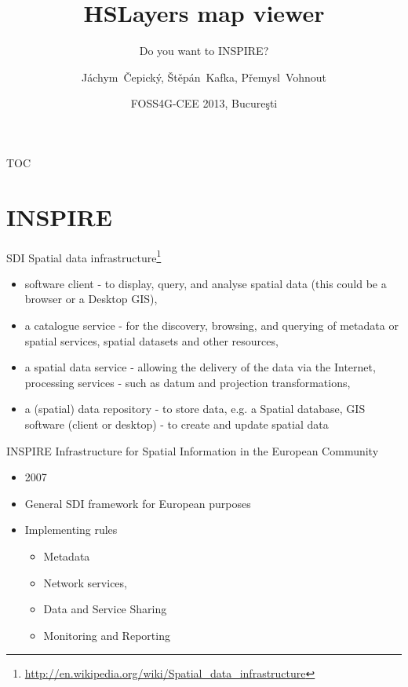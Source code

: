 \documentclass[xcolor=dvipsnames]{beamer}
\title[HSLayers] %
{HSLayers map viewer}
\subtitle {Do you want to INSPIRE?}
\author[J. Čepický] %
{Jáchym~Čepický\inst{1}, Štěpán~Kafka\inst{1}, Přemysl~Vohnout\inst{2}}
\institute %
{
  \inst{1}%
  Help Service - Remote Sensing s.r.o. \\
  Benešov\\
  \url{http://hsrs.cz}\\

  \inst{2}%
  Czech Center for Science and Society\\
  Prague\\
  \url{http://ccss.cz}\\
}
\date[] %
{FOSS4G-CEE 2013, Bucure\c{s}ti}
\begin{document}
\begin{frame}
  \titlepage
\end{frame}

\begin{frame}{TOC}
  \tableofcontents
\end{frame}

\section{INSPIRE}

\begin{frame}{SDI}
Spatial data infrastructure\footnote{\url{http://en.wikipedia.org/wiki/Spatial_data_infrastructure}}
\begin{itemize} 
    \item software client - to display, query, and analyse spatial data (this could be a browser or a Desktop GIS),
    \item a catalogue service - for the discovery, browsing, and querying of metadata or spatial services, spatial datasets and other resources,
    \item a spatial data service - allowing the delivery of the data via the Internet, processing services - such as datum and projection transformations,
    \item a (spatial) data repository - to store data, e.g. a Spatial database, GIS software (client or desktop) - to create and update spatial data
\end{itemize}
\end{frame}

\begin{frame}{INSPIRE}
Infrastructure for Spatial Information in the European Community
\begin{itemize} 
    \item 2007
    \item General SDI framework for European purposes
    \item Implementing rules 
        \begin{itemize}
            \item Metadata
            \item Network services,
            \item Data and Service Sharing
            \item Monitoring and Reporting
        \end{itemize}
\end{itemize}
\end{frame}
\end{document}
